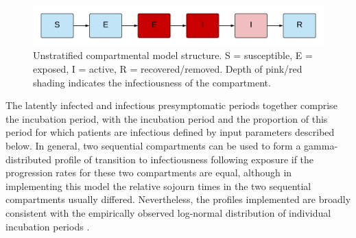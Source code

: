 \begin{figure}[h]
    \includegraphics[width=\textwidth]{../model/covid_19_seeiir.pdf}
    \caption{Unstratified compartmental model structure. S = susceptible, E = exposed, I = active, R = recovered/removed. Depth of pink/red shading indicates the infectiousness of the compartment.}
    \label{fig:seeiir}
\end{figure}

The latently infected and infectious presymptomatic periods together comprise the incubation period, with the incubation period and the proportion of this period for which patients are infectious defined by input parameters described below. In general, two sequential compartments can be used to form a gamma-distributed profile of transition to infectiousness following exposure if the progression rates for these two compartments are equal, although in implementing this model the relative sojourn times in the two sequential compartments usually differed. Nevertheless, the profiles implemented are broadly consistent with the empirically observed log-normal distribution of individual incubation periods \cite{RN51}.
